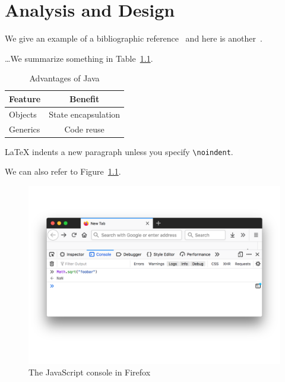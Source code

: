 \chapter{Analysis and Design}
\label{chap:analysis-and-design}

We give an example of a bibliographic
reference~\cite{Lindholm-Yellin:99} and here is another~\cite{Cormen-al:01}.

\bigskip

\dots We summarize something in Table~\ref{tab:java-advantages}.

\begin{table}[tb] %
  \centering
  \begin{tabular}{l c}  %
    Feature  & Benefit
 \\\hline
    Objects  & State encapsulation
 \\
    Generics & Code reuse
  \end{tabular}
  \caption{Advantages of Java}
  \label{tab:java-advantages}
\end{table}

\bigskip

\noindent
LaTeX indents a new paragraph unless you specify \lstinline{\noindent}.

\bigskip

We can also refer to Figure~\ref{fig:firefox-js-console}.

\begin{figure}[tb] %
  \centering
  \includegraphics[width=.9\linewidth]{firefox-js-console}
  \caption{The JavaScript console in Firefox }
  \label{fig:firefox-js-console}
\end{figure}
